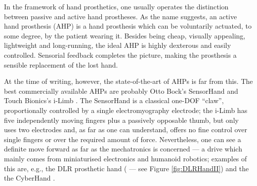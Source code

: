 In the framework of hand prosthetics, one usually operates the
distinction between passive and active hand prostheses. As the name
suggests, an active hand prosthesis (AHP) is a hand prosthesis which
can be voluntarily actuated, to some degree, by the patient wearing
it. Besides being cheap, visually appealing, lightweight and
long-running, the ideal AHP is highly dexterous and easily
controlled. Sensorial feedback completes the picture, making the
prosthesis a sensible replacement of the lost hand.

At the time of writing, however, the state-of-the-art of AHPs is far
from this. The best commercially available AHPs are probably Otto
Bock's SensorHand \cite{sensorhand} and Touch Bionics's i-Limb
\cite{ilimb}. The SensorHand is a classical one-DOF ``claw'',
proportionally controlled by a single electromyography electrode; the
i-Limb has five independently moving fingers plus a passively
opposable thumb, but only uses two electrodes and, as far as one can
understand, offers no fine control over single fingers or over the
required amount of force. Nevertheless, one can see a definite move
forward as far as the mechatronics is concerned --- a drive which
mainly comes from miniaturised electronics and humanoid robotics;
examples of this are, e.g., the DLR prosthetic hand (\cite{Hua2006}
--- see Figure \ref{fig:DLRHandII}) and the the CyberHand
\cite{cyberhand}.


